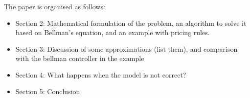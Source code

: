 \documentclass[main.tex]{subfiles}
\begin{document}
The paper is organised as follows:
\begin{itemize}
\item Section 2: Mathematical formulation of the problem, an algorithm
  to solve it based on Bellman's equation, and an example with pricing rules.
\item Section 3: Discussion of some approximations (list them), and
  comparison with the bellman controller in the example
\item Section 4: What happens when the model is not correct?
\item Section 5: Conclusion
\end{itemize}


\biblio
\end{document}
